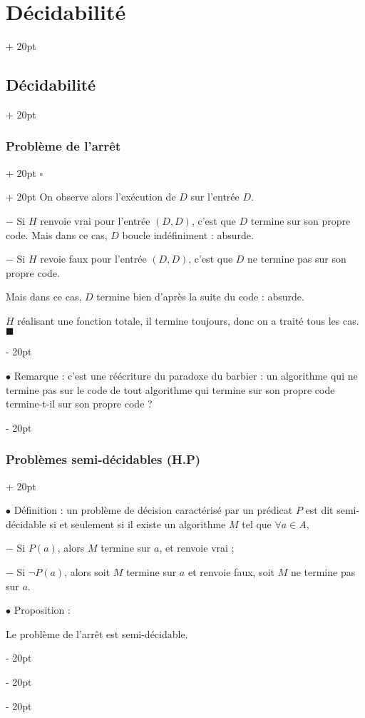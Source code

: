 \documentclass[a4paper, 12pt, twoside]{article}
\newcommand{\ind}[1][20pt]{\advance\leftskip + #1}
\newcommand{\deind}[1][20pt]{\advance\leftskip - #1}
\newenvironment{indt}[2][20pt]{#2 \par \ind[#1]}{\par \deind} %
\newenvironment{proof}[1][{}]{\begin{indt}{$\square$ #1}}{$\blacksquare$ \end{indt}}
\begin{document}
\begin{indt}{\section{Décidabilité}}
\begin{indt}{\subsection{Décidabilité}}
\begin{indt}{\subsubsection{Problème de l'arrêt}}
\begin{proof}
                    On observe alors l'exécution de $D$ sur l'entrée $D$.

                    $-$ Si $H$ renvoie vrai pour l'entrée $(D, D)$, c'est que $D$ termine sur son propre code.
                    Mais dans ce cas, $D$ boucle indéfiniment : absurde.

                    $-$ Si $H$ revoie faux pour l'entrée $(D, D)$, c'est que $D$ ne termine pas sur son propre code.

                    Mais dans ce cas, $D$ termine bien d'après la suite du code : absurde.

                    $H$ réalisant une fonction totale, il termine toujours, donc on a traité tous les cas.
                \end{proof}

                \vspace{12pt}
                
                $\bullet$ Remarque : c'est une réécriture du paradoxe du barbier : un algorithme qui ne termine pas sur le code de tout algorithme qui termine sur son propre code termine-t-il sur son propre code ?
            \end{indt}

            \vspace{12pt}
            
            \begin{indt}{\subsubsection{Problèmes semi-décidables (H.P)}}
                \label{1.2.5}

                $\bullet$ Définition : un problème de décision caractérisé par un prédicat $P$ est dit semi-décidable si et seulement si il existe un algorithme $M$ tel que $\forall a \in A$,

                $-$ Si $P(a)$, alors $M$ termine sur $a$, et renvoie vrai ;

                $-$ Si $\neg P(a)$, alors soit $M$ termine sur $a$ et renvoie faux, soit $M$ ne termine pas sur $a$.

                \vspace{12pt}
                
                $\bullet$ Proposition :
                \begin{emphBox}
                    Le problème de l'arrêt est semi-décidable.
                \end{emphBox}


\end{indt}
\end{indt}
\end{indt}
\end{document}
